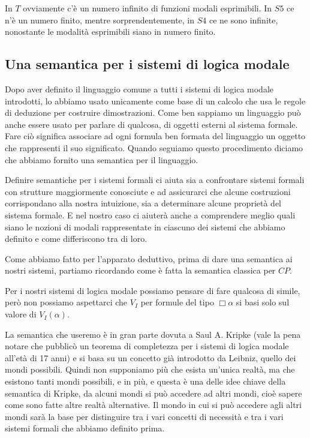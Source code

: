 \documentclass[a4paper, 12pt]{article}
\begin{document}
In $T$ ovviamente c'è un numero infinito di funzioni modali esprimibili.
In $S5$ ce n'è un numero finito, mentre sorprendentemente,
in $S4$ ce ne sono infinite, nonostante le modalità esprimibili siano in numero finito.

\subsection{Una semantica per i sistemi di logica modale}
Dopo aver definito il linguaggio comune a tutti i sistemi di logica modale introdotti,
lo abbiamo usato unicamente come base di un calcolo che usa le regole di deduzione per costruire
dimostrazioni. Come ben sappiamo un linguaggio può anche essere usato per parlare di qualcosa,
di oggetti esterni al sistema formale.
Fare ciò significa associare ad ogni formula ben formata del linguaggio un oggetto
che rappresenti il suo significato.
Quando seguiamo questo procedimento diciamo che abbiamo fornito una semantica per il linguaggio.

Definire semantiche per i sistemi formali ci aiuta sia a confrontare sistemi formali
con strutture maggiormente conosciute e ad assicurarci
che alcune costruzioni corrispondano alla nostra intuizione,
sia a determinare alcune proprietà del sistema formale. E nel nostro caso ci aiuterà anche
a comprendere meglio quali siano le nozioni di modali rappresentate in ciascuno dei sistemi
che abbiamo definito e come differiscono tra di loro.


Come abbiamo fatto per l'apparato deduttivo, prima di dare una semantica ai nostri sistemi,
partiamo ricordando come è fatta la semantica classica per $CP$.

Per i nostri sistemi di logica modale possiamo pensare di fare qualcosa di simile,
però non possiamo aspettarci che $V_I$ per formule del tipo $\Box \alpha$ si basi solo
sul valore di $V_I(\alpha)$.

La semantica che useremo è in gran parte dovuta a Saul A. Kripke (vale la pena notare
che pubblicò un teorema di completezza per i sistemi di logica modale all'età di 17 anni)
e si basa su un concetto già introdotto da Leibniz, quello dei mondi possibili.
Quindi non supponiamo più che esista un'unica realtà, ma che esistono tanti mondi possibili,
e in più, e questa è una delle idee chiave della semantica di Kripke, da alcuni mondi
si può accedere ad altri mondi, cioè sapere come sono fatte altre realtà alternative.
Il mondo in cui si può accedere agli altri mondi sarà la base per distinguire
tra i vari concetti di necessità e tra i vari sistemi formali che abbiamo definito prima.
\end{document}
